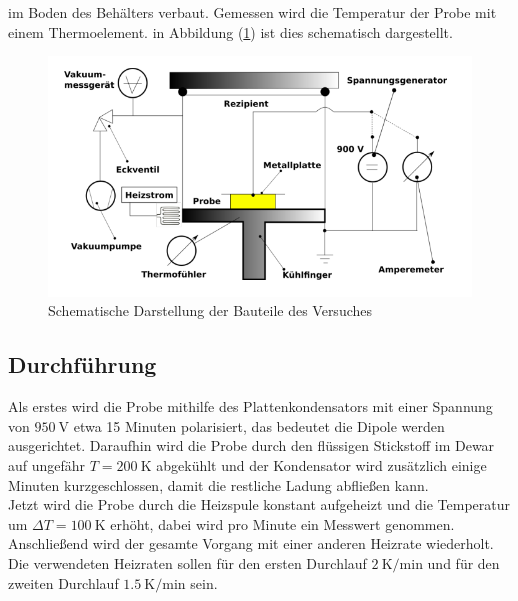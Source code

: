 im Boden des Behälters verbaut. Gemessen wird die Temperatur der Probe mit einem Thermoelement. in Abbildung (\ref{fig:schema48}) ist dies schematisch dargestellt.
\begin{figure}[h!]
  \centering
  \includegraphics[scale=0.5]{fig/schemav48.png}
  \caption{Schematische Darstellung der Bauteile des Versuches \cite[3]{Anleitung1}}
  \label{fig:schema48}
\end{figure}
\subsection{Durchführung}
\label{sec:durchff2}
Als erstes wird die Probe mithilfe des Plattenkondensators mit einer Spannung von $\SI{950}{\volt}$ etwa 15 Minuten polarisiert, das bedeutet die Dipole werden ausgerichtet. Daraufhin wird die Probe durch den flüssigen Stickstoff im Dewar auf ungefähr $T=\SI{200}{\kelvin}$ abgekühlt und der Kondensator wird zusätzlich einige Minuten kurzgeschlossen, damit die restliche Ladung abfließen kann. \\
Jetzt wird die Probe durch die Heizspule konstant aufgeheizt und die Temperatur um $\Delta T=\SI{100}{\kelvin}$ erhöht, dabei wird pro Minute ein Messwert genommen. Anschließend wird der gesamte Vorgang mit einer
anderen Heizrate wiederholt. Die verwendeten Heizraten sollen für den ersten Durchlauf $\SI{2}{\kelvin\per\minute}$ und für den zweiten Durchlauf $\SI{1.5}{\kelvin\per\minute}$ sein.
